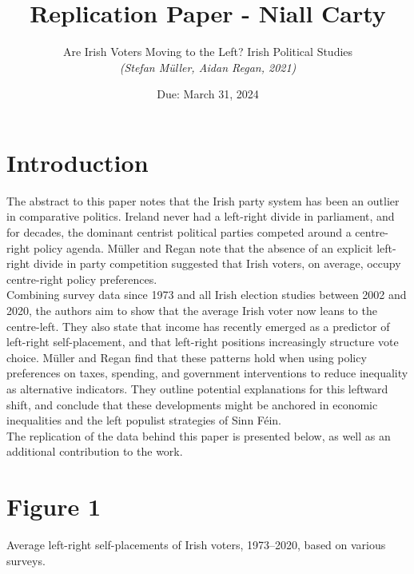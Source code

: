\documentclass[12pt,letterpaper]{article}
\title{Replication Paper - Niall Carty}
\date{Due: March 31, 2024}
\author{Are Irish Voters Moving to the Left? Irish Political Studies \\ \textit{(Stefan Müller, Aidan Regan, 2021)} }
\begin{document}
	\maketitle
	\section*{Introduction}

\vspace{.25cm}
The abstract to this paper notes that the Irish party system has been an outlier in comparative politics. Ireland never had a left-right divide in parliament, and for decades, the dominant centrist political parties competed around a centre-right policy agenda. Müller and Regan note that the absence of an explicit left-right divide in party competition suggested that Irish voters, on average, occupy centre-right policy preferences. \\

\noindent Combining survey data since 1973 and all Irish election studies between 2002 and 2020, the authors aim to show that the average Irish voter now leans to the centre-left. They also state that income has recently emerged as a predictor of left-right self-placement, and that left-right
positions increasingly structure vote choice. Müller and Regan find that these patterns hold when using
policy preferences on taxes, spending, and government interventions to
reduce inequality as alternative indicators. They outline potential explanations
for this leftward shift, and conclude that these developments might be
anchored in economic inequalities and the left populist strategies of Sinn Féin. \\

\noindent The replication of the data behind this paper is presented below, as well as an additional contribution to the work. 


\newpage

\section*{Figure 1} 
\vspace{.25cm}

Average left-right self-placements of Irish voters, 1973–2020, based on various
surveys.
\end{document}
